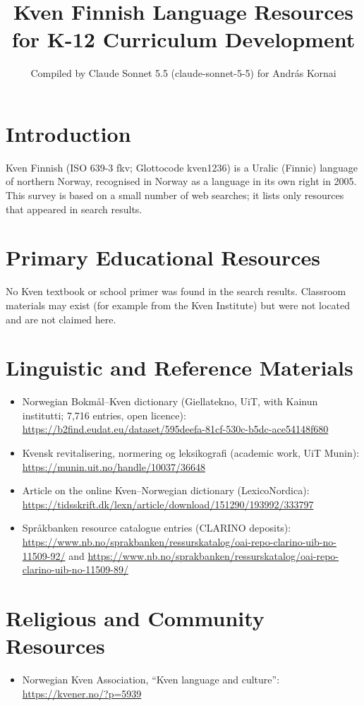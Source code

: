 \documentclass[12pt]{article}
\title{Kven Finnish Language Resources for K-12 Curriculum Development}
\author{Compiled by Claude Sonnet 5.5 (claude-sonnet-5-5) for Andr\'as Kornai}
\date{}
\begin{document}
\maketitle

\section{Introduction}
Kven Finnish (ISO 639-3 fkv; Glottocode kven1236) is a Uralic (Finnic) language of northern Norway, recognised in Norway as a language in its own right in 2005. This survey is based on a small number of web searches; it lists only resources that appeared in search results.

\section{Primary Educational Resources}
No Kven textbook or school primer was found in the search results. Classroom materials may exist (for example from the Kven Institute) but were not located and are not claimed here.

\section{Linguistic and Reference Materials}
\begin{itemize}
\item Norwegian Bokm\r{a}l--Kven dictionary (Giellatekno, UiT, with Kainun institutti; 7,716 entries, open licence): \url{https://b2find.eudat.eu/dataset/595deefa-81cf-530c-b5dc-ace54148f680}
\item Kvensk revitalisering, normering og leksikografi (academic work, UiT Munin): \url{https://munin.uit.no/handle/10037/36648}
\item Article on the online Kven--Norwegian dictionary (LexicoNordica): \url{https://tidsskrift.dk/lexn/article/download/151290/193992/333797}
\item Spr\r{a}kbanken resource catalogue entries (CLARINO deposits): \url{https://www.nb.no/sprakbanken/ressurskatalog/oai-repo-clarino-uib-no-11509-92/} and \url{https://www.nb.no/sprakbanken/ressurskatalog/oai-repo-clarino-uib-no-11509-89/}
\end{itemize}

\section{Religious and Community Resources}
\begin{itemize}
\item Norwegian Kven Association, ``Kven language and culture'': \url{https://kvener.no/?p=5939}
\end{itemize}
\end{document}
